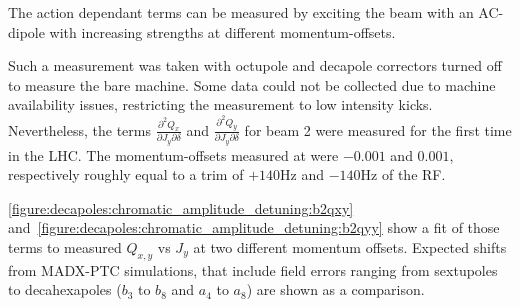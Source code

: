 The action dependant terms can be measured by exciting the beam with an AC-dipole with increasing
strengths at different momentum-offsets.

Such a measurement was taken with octupole and decapole correctors turned off to measure the bare
machine. Some data could not be collected due to machine availability issues, restricting the
measurement to low intensity kicks. 
Nevertheless, the terms $\frac{\partial^2 Q_x}{\partial J_y \partial \delta}$ and $\frac{\partial^2
Q_y}{\partial J_y \partial \delta}$ for beam 2 were measured for the first time in the LHC. The
momentum-offsets measured at were $-0.001$ and $0.001$, respectively roughly equal to a trim of 
$+140$Hz and $-140$Hz of the RF.

\cref{figure:decapoles:chromatic_amplitude_detuning:b2qxy}
and~\cref{figure:decapoles:chromatic_amplitude_detuning:b2qyy} show a fit of those terms to measured
$Q_{x,y}$ vs $J_{y}$ at two different momentum offsets. Expected shifts from MADX-PTC simulations,
that include field errors ranging from sextupoles to decahexapoles ($b_3$ to $b_8$ and $a_4$ to
$a_8$) are shown as a comparison.


